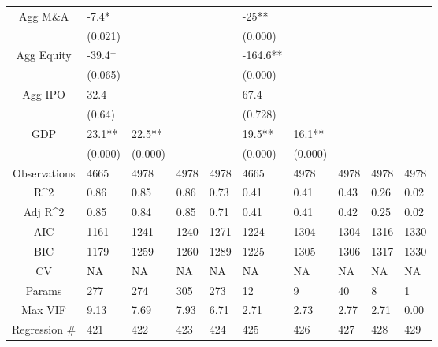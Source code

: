 \documentclass{article}
\begin{document}
\begin{table}[H]
\begin{tabular}{|clllllllll|}
  Agg M\&A & -7.4* &  &  &  & -25** &  &  &  &  \\
   & (0.021) &  &  &  & (0.000) &  &  &  &  \\
  Agg Equity & -39.4$^{+}$ &  &  &  & -164.6** &  &  &  &  \\
   & (0.065) &  &  &  & (0.000) &  &  &  &  \\
  Agg IPO & 32.4 &  &  &  & 67.4 &  &  &  &  \\
   & (0.64) &  &  &  & (0.728) &  &  &  &  \\
  GDP & 23.1** & 22.5** &  &  & 19.5** & 16.1** &  &  &  \\
   & (0.000) & (0.000) &  &  & (0.000) & (0.000) &  &  &  \\
  \hline
 Observations & 4665 & 4978 & 4978 & 4978 & 4665 & 4978 & 4978 & 4978 & 4978 \\
  R^2 & 0.86 & 0.85 & 0.86 & 0.73 & 0.41 & 0.41 & 0.43 & 0.26 & 0.02 \\
  Adj R^2 & 0.85 & 0.84 & 0.85 & 0.71 & 0.41 & 0.41 & 0.42 & 0.25 & 0.02 \\
  AIC & 1161 & 1241 & 1240 & 1271 & 1224 & 1304 & 1304 & 1316 & 1330 \\
  BIC & 1179 & 1259 & 1260 & 1289 & 1225 & 1305 & 1306 & 1317 & 1330 \\
  CV & NA & NA & NA & NA & NA & NA & NA & NA & NA \\
  Params & 277 & 274 & 305 & 273 & 12 & 9 & 40 & 8 & 1 \\
  Max VIF & 9.13 & 7.69 & 7.93 & 6.71 & 2.71 & 2.73 & 2.77 & 2.71 & 0.00 \\
  Regression \# & 421 & 422 & 423 & 424 & 425 & 426 & 427 & 428 & 429 \\
   \hline
\end{tabular}

\end{table}
\end{document}
